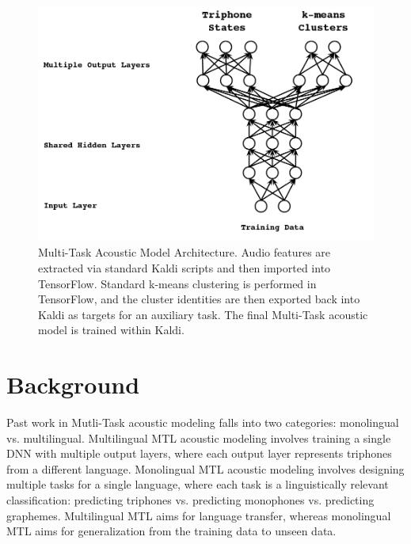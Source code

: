 \documentclass[a4paper]{article}
\begin{document}
\begin{figure}[!htbp]
  \centering
{}
  \includegraphics[width=\linewidth]{figs/heigold-2013-dnn-c.png}
  \caption{Multi-Task Acoustic Model Architecture. Audio features are extracted via standard Kaldi scripts and then imported into TensorFlow. Standard k-means clustering is performed in TensorFlow, and the cluster identities are then exported back into Kaldi as targets for an auxiliary task. The final Multi-Task acoustic model is trained within Kaldi.}
    \label{fig:mtl-dnn}
  \endminipage\hfill
\end{figure}


\section{Background}

Past work in Mutli-Task acoustic modeling falls into two categories: monolingual vs. multilingual. Multilingual MTL acoustic modeling involves training a single DNN with multiple output layers, where each output layer represents triphones from a different language. \cite{huang2013, heigold2013, tuske2014multilingual, grezl2016} Monolingual MTL acoustic modeling involves designing multiple tasks for a single language, where each task is a linguistically relevant classification: predicting triphones vs. predicting monophones vs. predicting graphemes. Multilingual MTL aims for language transfer, whereas monolingual MTL aims for generalization from the training data to unseen data.

\end{document}
